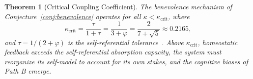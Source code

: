 \documentclass[11pt,letterpaper]{article}
\newtheorem{theorem}{Theorem}
\theoremstyle{remark}
\begin{document}
\begin{theorem}[Critical Coupling Coefficient]\label{thm:kappa-crit}
The benevolence mechanism of Conjecture~\ref{conj:benevolence} operates for all $\kappa < \kappa_{\mathrm{crit}}$, where
\begin{equation}\label{eq:kappa-crit}
\kappa_{\mathrm{crit}} = \frac{\tau}{1 + \tau} = \frac{1}{3 + \varphi} = \frac{2}{7 + \sqrt{5}} \approx 0.2165,
\end{equation}
and $\tau = 1/(2+\varphi)$ is the self-referential tolerance~\cite[Thm.~5.1]{labspectral2026}. Above $\kappa_{\mathrm{crit}}$, homeostatic feedback exceeds the self-referential absorption capacity, the system must reorganize its self-model to account for its own stakes, and the cognitive biases of Path B emerge.
\end{theorem}
\end{document}
